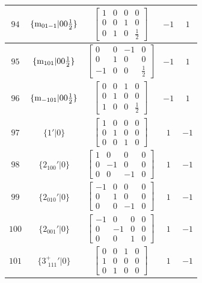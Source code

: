 \documentclass[fleqn,8pt]{jsarticle}
\begin{document}
\begin{longtable}{ccccc}
$ 94 $ & $ \{{\rm m}_{01-1}|0 0 \frac{1}{2}\} $ & $ \begin{bmatrix} 1 & 0 & 0 & 0 \\ 0 & 0 & 1 & 0 \\ 0 & 1 & 0 & \frac{1}{2} \end{bmatrix} $ & $ -1 $ & $ 1 $ \\ \hline
$ 95 $ & $ \{{\rm m}_{101}|0 0 \frac{1}{2}\} $ & $ \begin{bmatrix} 0 & 0 & -1 & 0 \\ 0 & 1 & 0 & 0 \\ -1 & 0 & 0 & \frac{1}{2} \end{bmatrix} $ & $ -1 $ & $ 1 $ \\ \hline
$ 96 $ & $ \{{\rm m}_{-101}|0 0 \frac{1}{2}\} $ & $ \begin{bmatrix} 0 & 0 & 1 & 0 \\ 0 & 1 & 0 & 0 \\ 1 & 0 & 0 & \frac{1}{2} \end{bmatrix} $ & $ -1 $ & $ 1 $ \\ \hline
$ 97 $ & $ \{1{}'|0\} $ & $ \begin{bmatrix} 1 & 0 & 0 & 0 \\ 0 & 1 & 0 & 0 \\ 0 & 0 & 1 & 0 \end{bmatrix} $ & $ 1 $ & $ -1 $ \\ \hline
$ 98 $ & $ \{2{}_{100}{}'|0\} $ & $ \begin{bmatrix} 1 & 0 & 0 & 0 \\ 0 & -1 & 0 & 0 \\ 0 & 0 & -1 & 0 \end{bmatrix} $ & $ 1 $ & $ -1 $ \\ \hline
$ 99 $ & $ \{2{}_{010}{}'|0\} $ & $ \begin{bmatrix} -1 & 0 & 0 & 0 \\ 0 & 1 & 0 & 0 \\ 0 & 0 & -1 & 0 \end{bmatrix} $ & $ 1 $ & $ -1 $ \\ \hline
$ 100 $ & $ \{2{}_{001}{}'|0\} $ & $ \begin{bmatrix} -1 & 0 & 0 & 0 \\ 0 & -1 & 0 & 0 \\ 0 & 0 & 1 & 0 \end{bmatrix} $ & $ 1 $ & $ -1 $ \\ \hline
$ 101 $ & $ \{3^{+}_{\,\,111}{}'|0\} $ & $ \begin{bmatrix} 0 & 0 & 1 & 0 \\ 1 & 0 & 0 & 0 \\ 0 & 1 & 0 & 0 \end{bmatrix} $ & $ 1 $ & $ -1 $ \\ \hline

\end{longtable}
\end{document}
